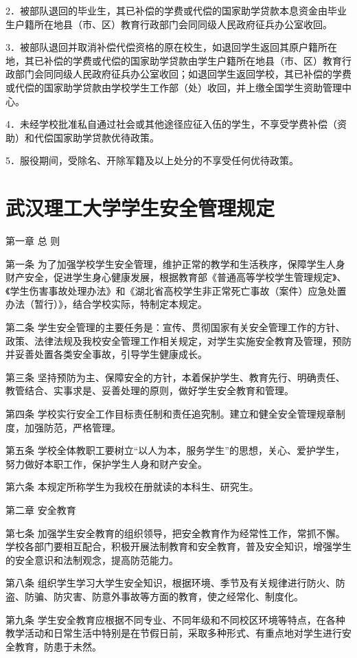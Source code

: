 \documentclass[UTF8,12pt,a4paper]{report}
\begin{document}
2．被部队退回的毕业生，其已补偿的学费或代偿的国家助学贷款本息资金由毕业生户籍所在地县（市、区）教育行政部门会同同级人民政府征兵办公室收回。

3．被部队退回并取消补偿代偿资格的原在校生，如退回学生返回其原户籍所在地，其已补偿的学费或代偿的国家助学贷款由学生户籍所在地县（市、区）教育行政部门会同同级人民政府征兵办公室收回；如退回学生返回学校，其已补偿的学费或代偿的国家助学贷款由学校学生工作部（处）收回，并上缴全国学生资助管理中心。

4．未经学校批准私自通过社会或其他途径应征入伍的学生，不享受学费补偿（资助）和代偿国家助学贷款优待政策。

5．服役期间，受除名、开除军籍及以上处分的不享受任何优待政策。

\chapter{武汉理工大学学生安全管理规定}
第一章 总 则

第一条 为了加强学校学生安全管理，维护正常的教学和生活秩序，保障学生人身财产安全，促进学生身心健康发展，根据教育部《普通高等学校学生管理规定》、《学生伤害事故处理办法》和《湖北省高校学生非正常死亡事故（案件）应急处置办法（暂行）》，结合学校实际，特制定本规定。

第二条 学生安全管理的主要任务是：宣传、贯彻国家有关安全管理工作的方针、政策、法律法规及我校安全管理工作相关规定，对学生实施安全教育及管理，预防并妥善处置各类安全事故，引导学生健康成长。

第三条 坚持预防为主、保障安全的方针，本着保护学生、教育先行、明确责任、教管结合、实事求是、妥善处理的原则，做好学生安全教育和管理。

第四条 学校实行安全工作目标责任制和责任追究制。建立和健全安全管理规章制度，加强防范，严格管理。

第五条 学校全体教职工要树立“以人为本，服务学生”的思想，关心、爱护学生，努力做好本职工作，保护学生人身和财产安全。

第六条 本规定所称学生为我校在册就读的本科生、研究生。

第二章 安全教育

第七条 加强学生安全教育的组织领导，把安全教育作为经常性工作，常抓不懈。学校各部门要相互配合，积极开展法制教育和安全教育，普及安全知识，增强学生的安全意识和法制观念，提高防范能力。

第八条 组织学生学习大学生安全知识，根据环境、季节及有关规律进行防火、防盗、防骗、防灾害、防意外事故等方面的教育，使之经常化、制度化。

第九条 学生安全教育应根据不同专业、不同年级和不同校区环境等特点，在各种教学活动和日常生活中特别是在节假日前，采取多种形式、有重点地对学生进行安全教育，防患于未然。
\end{document}
